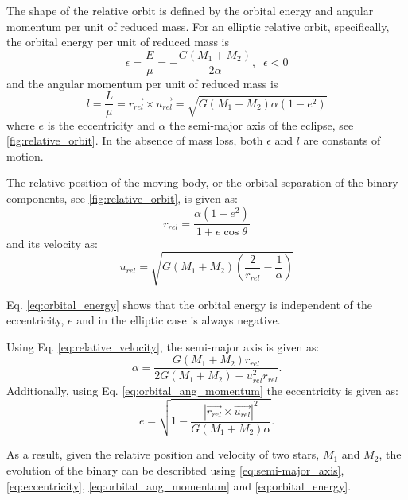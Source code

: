 The shape of the relative orbit is defined by the orbital energy and angular momentum per unit of reduced mass. For an elliptic relative orbit, specifically, the orbital energy per unit of reduced mass is
\begin{equation}\label{eq:orbital_energy}
    \epsilon = \frac{E}{\mu} = - \frac{G (M_1 + M_2)}{2\alpha}, \; \; \epsilon  < 0
\end{equation}
and the angular momentum per unit of reduced mass is
\begin{equation}\label{eq:orbital_ang_momentum}
    l = \frac{L}{\mu} = \vec{r_{rel}} \times \vec{u_{rel}} =\sqrt{G (M_1 + M_2) \alpha (1-e^2)}
\end{equation}
where $e$ is the eccentricity and $\alpha$ the semi-major axis of the eclipse, see \cref{fig:relative_orbit}. In the absence of mass loss, both $\epsilon$ and $l$ are constants of motion.

The relative position of the moving body, or the orbital separation of the binary components, see \cref{fig:relative_orbit}, is given as:
\begin{equation}\label{eq:relative_position}
    r_{rel} = \frac{\alpha (1-e^2)}{1+e \cos{\theta}}
\end{equation}
and its velocity as:
\begin{equation}\label{eq:relative_velocity}
    u_{rel}= \sqrt{G(M_1 +M_2) \left( \frac{2}{r_{rel}} - \frac{1}{\alpha}\right)}
\end{equation}

Eq. \eqref{eq:orbital_energy} shows that the orbital energy is independent of the eccentricity, $e$ and in the elliptic case is always negative.

Using Eq. \eqref{eq:relative_velocity}, the semi-major axis is given as:
\begin{equation}\label{eq:semi-major_axis}
    \alpha = \frac{G(M_1+M_2)r_{rel}}{2G(M_1+M_2) - u_{rel}^2 r_{rel}}.
\end{equation}
Additionally, using  Eq. \eqref{eq:orbital_ang_momentum} the eccentricity is given as:
\begin{equation}\label{eq:eccentricity}
    e = \sqrt{1 - \frac{|\vec{r_{rel}} \times \vec{u_{rel}}|^2}{G (M_1+M_2) \alpha}}.
\end{equation}

As a result, given the relative position and velocity of two stars, $M_1$ and $M_2$, the evolution of the binary can be describted using \cref{eq:semi-major_axis}, \cref{eq:eccentricity}, \cref{eq:orbital_ang_momentum} and \cref{eq:orbital_energy}.


